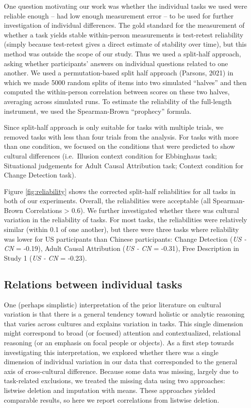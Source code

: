 \documentclass[
  man,floatsintext]{apa6}
\begin{document}
One question motivating our work was whether the individual tasks we used were reliable enough -- had low enough measurement error -- to be used for further investigation of individual differences. The gold standard for the measurement of whether a task yields stable within-person measurements is test-retest reliability (simply because test-retest gives a direct estimate of stability over time), but this method was outside the scope of our study. Thus we used a split-half approach, asking whether participants' answers on individual questions related to one another. We used a permutation-based split half approach (Parsons, 2021) in which we made 5000 random splits of items into two simulated ``halves'' and then computed the within-person correlation between scores on these two halves, averaging across simulated runs. To estimate the reliability of the full-length instrument, we used the Spearman-Brown ``prophecy'' formula.

Since split-half approach is only suitable for tasks with multiple trials, we removed tasks with less than four trials from the analysis. For tasks with more than one condition, we focused on the conditions that were predicted to show cultural differences (i.e.~Illusion context condition for Ebbinghaus task; Situational judgements for Adult Causal Attribution task; Context condition for Change Detection task).

Figure \ref{fig:reliability} shows the corrected split-half reliabilities for all tasks in both of our experiments. Overall, the reliabilities were acceptable (all Spearman-Brown Correlations \textgreater{} 0.6). We further investigated whether there was cultural variation in the reliability of tasks. For most tasks, the reliabilities were relatively similar (within 0.1 of one another), but there were three tasks where reliability was lower for US participants than Chinese participants: Change Detection (\emph{US - CN} = -0.19), Adult Causal Attribution (\emph{US - CN} = -0.31), Free Description in Study 1 (\emph{US - CN} = -0.23).

\hypertarget{relations-between-individual-tasks}{%
\subsection{Relations between individual tasks}\label{relations-between-individual-tasks}}

One (perhaps simplistic) interpretation of the prior literature on cultural variation is that there is a general tendency toward holistic or analytic reasoning that varies across cultures and explains variation in tasks. This single dimension might correspond to broad (or focused) attention and contextualized, relational reasoning (or an emphasis on focal people or objects). As a first step towards investigating this interpretation, we explored whether there was a single dimension of individual variation in our data that corresponded to the general axis of cross-cultural difference. Because some data was missing, largely due to task-related exclusions, we treated the missing data using two approaches: listwise deletion and imputation with means. These approaches yielded comparable results, so here we report correlations from listwise deletion.
\end{document}
